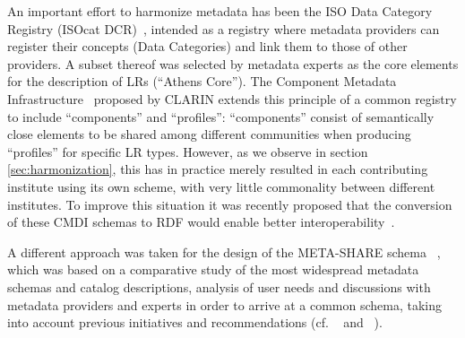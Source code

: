 \documentclass{llncs}
\begin{document}
An important effort to harmonize metadata has been the ISO Data Category Registry (ISOcat DCR)~\cite{kemps2008isocat}, intended as a registry where metadata providers can register their concepts (Data Categories) and link them to those of other providers. A subset thereof was selected by metadata experts as the core elements for the description of LRs (``Athens Core''). The Component Metadata Infrastructure~\cite{broeder2012cmdi} proposed by CLARIN extends this principle of a common registry to include ``components'' and ``profiles'': ``components'' consist of semantically close elements to be shared among different communities when producing ``profiles'' for specific LR types.
However, as  we observe in section \ref{sec:harmonization}, this has in practice
merely resulted in each contributing institute using its own scheme, with very
little commonality between different institutes. To improve this situation it
was recently proposed that the conversion of these CMDI schemas to RDF would
enable better interoperability~\cite{durco2014clarin}.

A different approach was taken for the design of the META-SHARE schema ~\cite{gavrilidou2012metashare}, which was based on a comparative study of the most widespread metadata schemas and catalog descriptions, analysis of user needs and discussions with metadata providers and experts in order to arrive at a common schema, taking into account previous initiatives and recommendations (cf. ~\cite{calzolari2010flarenet} and ~\cite{cieri2010metadata}).
\end{document}
